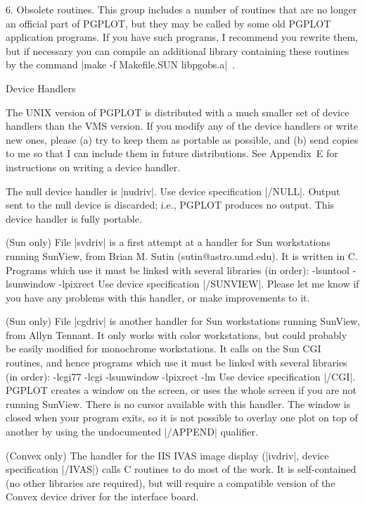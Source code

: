 \item{6.} Obsolete routines.  This group includes a number of routines
that are no longer an official part of PGPLOT, but they may be called
by some old PGPLOT application programs.  If you have such programs,
I recommend you rewrite them, but if necessary you can compile an 
additional library containing these routines by the command
|make -f Makefile.SUN libpgobs.a|~.

\beginsection Device Handlers

The UNIX version of PGPLOT is distributed with a much smaller set of 
device handlers than the VMS version.  If you modify any of the device 
handlers or write new ones, please (a) try to keep them as portable as 
possible, and (b) send copies to me so that I can include them in future 
distributions. See Appendix~E for instructions on writing a device 
handler.

The null device handler is |nudriv|. Use device specification |/NULL|. 
Output sent to the null device is discarded; i.e., PGPLOT produces no
output.  This device handler is fully portable. 

 (Sun only)
File |svdriv| is a first attempt at a handler for Sun workstations running
SunView, from Brian M. Sutin (sutin@astro.umd.edu). It is written in C. 
Programs which use it must be linked with several libraries (in order): 
\begintt
-lsuntool -lsunwindow -lpixrect
\endtt
Use device specification |/SUNVIEW|. Please let me know if you have any 
problems with this handler, or make improvements to it.

 (Sun only)
File |cgdriv| is another handler for Sun workstations running
SunView, from Allyn Tennant. It only works with color workstations, but
could probably be easily modified for monochrome workstations. It calls
on the Sun CGI routines, and hence programs which use it must be linked
with several libraries (in order): 
\begintt
-lcgi77 -lcgi -lsunwindow -lpixrect -lm
\endtt
Use device specification |/CGI|. PGPLOT creates a window on the screen,
or uses the whole screen if you are not running SunView. There is no
cursor available with this handler. The window is closed when your 
program exits, so it is not possible to overlay one plot on top of 
another by using the undocumented |/APPEND| qualifier.

 (Convex only)
The handler for the IIS IVAS image display (|ivdriv|, device 
specification |/IVAS|) calls C routines to do most of the work.  It is
self-contained (no other libraries are required), but will require a
compatible version of the Convex device driver for the interface board. 

